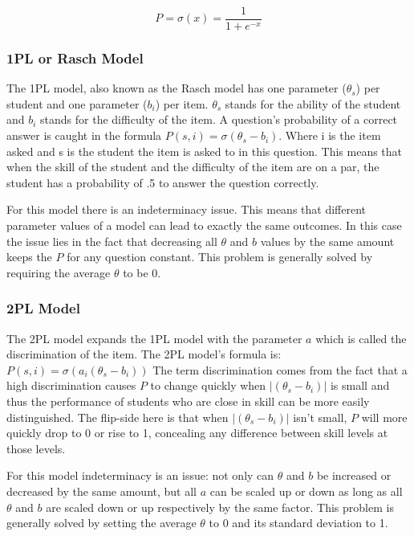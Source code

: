 \documentclass{scrartcl}
\begin{document}
\begin{equation}
\label{eq:logistic}
P = \sigma(x) = \frac{1}{1+e^{-x}}
\end{equation}

\subsubsection{1PL or Rasch Model}
\label{sec:1PL}
The 1PL model, also known as the Rasch model has one parameter ($\theta_{s}$) per student and one parameter ($b_{i}$) per item. $\theta_{s}$ stands for the ability of the student and $b_{i}$ stands for the difficulty of the item. A question's probability of a correct answer is caught in the formula $P(s,i) = \sigma(\theta_{s} - b_{i})$. Where i is the item asked and s is the student the item is asked to in this question. This means that when the skill of the student and the difficulty of the item are on a par, the student has a probability of .5 to answer the question correctly. 

For this model there is an indeterminacy issue. This means that different parameter values of a model can lead to exactly the same outcomes. In this case the issue lies in the fact that decreasing all $\theta$ and $b$ values by the same amount keeps the $P$ for any question constant. This problem is generally solved by requiring the average $\theta$ to be 0.

\subsubsection{2PL Model}
The 2PL model expands the 1PL model with the parameter $a$ which is called the discrimination of the item. The 2PL model's formula is: $P(s,i) = \sigma(a_{i} (\theta_{s} - b_{i}))$ The term discrimination comes from the fact that a high discrimination causes $P$ to change quickly when $|(\theta_{s} - b_{i})|$ is small and thus the performance of students who are close in skill can be more easily distinguished. The flip-side here is that when $|(\theta_{s} - b_{i})|$ isn't small, $P$ will more quickly drop to 0 or rise to 1, concealing any difference between skill levels at those levels. 

For this model indeterminacy is an issue: not only can $\theta$ and $b$ be increased or decreased by the same amount, but all $a$ can be scaled up or down as long as all $\theta$ and $b$ are scaled down or up respectively by the same factor. This problem is generally solved by setting the average $\theta$ to 0 and its standard deviation to 1. 
\end{document}

